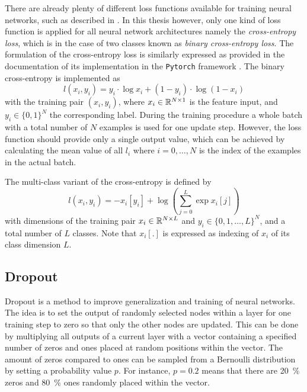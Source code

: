 There are already plenty of different loss functions available for training neural networks, such as described in \cite{LeCun2006}. 
In this thesis however, only one kind of loss function is applied for all neural network architectures namely the \emph{cross-entropy loss}, which is in the case of two classes known as \emph{binary cross-entropy loss}.
The formulation of the cross-entropy loss is similarly expressed as provided in the documentation of its implementation in the \texttt{Pytorch} framework \cite{Pytorch}.
The binary cross-entropy is implemented as
\begin{equation}\label{eq:nn_theory_binary_cross_entropy}
  l(x_i, y_i) = y_i \cdot \log x_i + (1 - y_i) \cdot \log (1 - x_i)
\end{equation}
with the training pair $(x_i, y_i)$, where $x_i \in \mathbb{R}^{N \times 1}$ is the feature input, and $y_i \in \{0, 1\}^N$ the corresponding label.
During the training procedure a whole batch with a total number of $N$ examples is used for one update step.
However, the loss function should provide only a single output value, which can be achieved by calculating the mean value of all $l_i$ where $i = 0, \dots, N$ is the index of the examples in the actual batch.

The multi-class variant of the cross-entropy is defined by
\begin{equation}
  l(x_i, y_i) = - x_i[y_i] + \log{\left( \sum_{j=0}^{L} \exp{x_i[j]} \right)}
\end{equation}
with dimensions of the training pair $x_i \in \mathbb{R}^{N \times L}$ and $y_i \in \{0, 1, \dots, L\}^N$, and a total number of $L$ classes.
Note that $x_i[.]$ is expressed as indexing of $x_i$ of its class dimension $L$. 



\subsection{Dropout}
Dropout \cite{Hinton2012} is a method to improve generalization and training of neural networks.
The idea is to set the output of randomly selected nodes within a layer for one training step to zero so that only the other nodes are updated.
This can be done by multiplying all outputs of a current layer with a vector containing a specified number of zeros and ones placed at random positions within the vector.
The amount of zeros compared to ones can be sampled from a Bernoulli distribution by setting a probability value $p$.
For instance, $p=0.2$ means that there are \SI{20}{\percent} zeros and \SI{80}{\percent} ones randomly placed within the vector.


